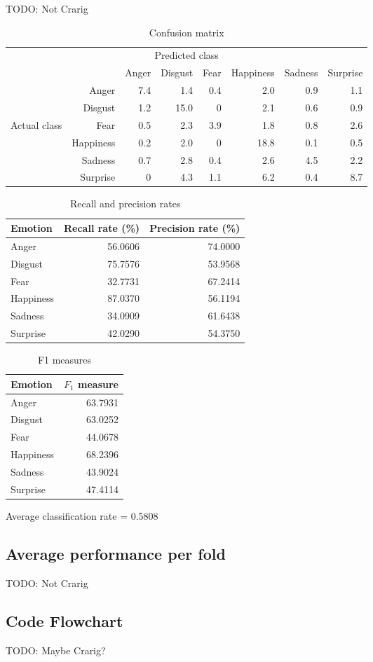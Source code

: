 \documentclass[12pt]{article}
\begin{document}
TODO: Not Crarig




\begin{table}
\centering
\begin{tabular}{r r | r r r r r r}
\multicolumn{8}{c}{Predicted class} \\
&  & Anger & Disgust & Fear & Happiness & Sadness & Surprise \\
\hline
& Anger & 7.4 & 1.4  & 0.4 & 2.0  & 0.9 & 1.1 \\
 & Disgust & 1.2 & 15.0 & 0   & 2.1  & 0.6 & 0.9 \\
Actual class & Fear & 0.5 & 2.3  & 3.9 & 1.8  & 0.8 & 2.6 \\
 & Happiness & 0.2 & 2.0  & 0   & 18.8 & 0.1 & 0.5 \\
& Sadness & 0.7 & 2.8  & 0.4 & 2.6  & 4.5 & 2.2 \\
& Surprise & 0   & 4.3  & 1.1 & 6.2  & 0.4 & 8.7 \\
\end{tabular}
\caption{Confusion matrix}
\end{table}

\begin{table}
\centering
\begin{tabular}{l | r r}
Emotion & Recall rate (\%) & Precision rate (\%) \\
\hline
Anger & 56.0606 & 74.0000 \\
Disgust & 75.7576 & 53.9568 \\
Fear & 32.7731 & 67.2414 \\
Happiness & 87.0370 & 56.1194 \\
Sadness & 34.0909 & 61.6438 \\
Surprise & 42.0290 & 54.3750 \\
\end{tabular}
\caption{Recall and precision rates}
\end{table}

\begin{table}
\centering
\begin{tabular}{l | r}
Emotion & \( F_1 \) measure \\
\hline
Anger & 63.7931 \\
Disgust & 63.0252 \\
Fear & 44.0678 \\
Happiness & 68.2396 \\
Sadness & 43.9024 \\
Surprise & 47.4114 \\
\end{tabular}
\caption{F1 measures}
\end{table}

Average classification rate = 0.5808 \\ 



\subsection*{Average performance per fold}

TODO: Not Crarig


\subsection*{Code Flowchart}

TODO: Maybe Crarig?
\end{document}
